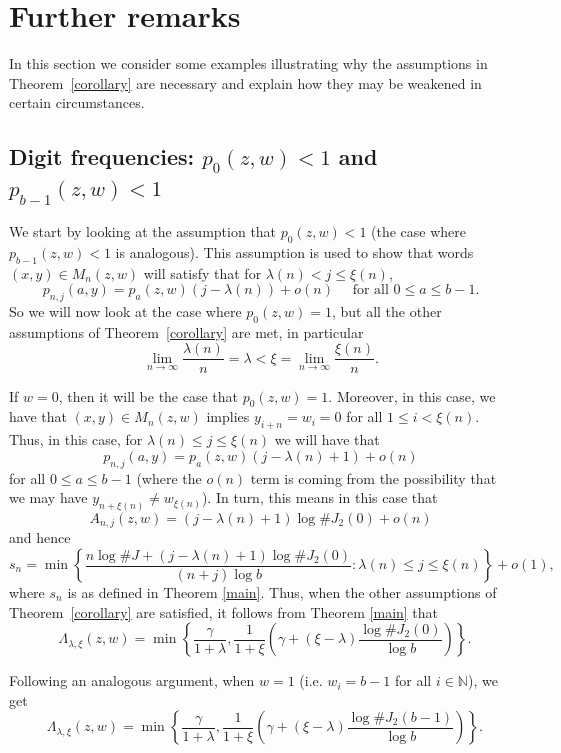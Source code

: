 \documentclass[12pt]{article}
\theoremstyle{remark}
\numberwithin{equation}{section}
\renewcommand{\Bbb}[1]{\mathbb{#1}}
\newcommand{\N}{{\Bbb N}}         %
\newcommand{\0}{\mathbf{0}}
\DeclareMathOperator{\dimh}{\dim_H}
\begin{document}
 
\section{Further remarks} \label{further remarks}
In this section we consider some examples illustrating why the assumptions in Theorem~\ref{corollary} are necessary and explain how they may be weakened in certain circumstances. 

\subsection{Digit frequencies: $p_{0}(z,w) <1$ and $p_{b-1}(z,w)<1$}

We start by looking at the assumption that $p_{0}(z,w)<1$ (the case where $p_{b-1}(z,w)<1$ is analogous). This assumption is used to show that words $(x,y)\in M_n(z,w)$ will satisfy that for $\lambda(n)<j\leq\xi(n)$,
\begin{equation*}
p_{n,j}(a,y)=p_{a}(z,w)(j-\lambda(n))+\mathit{o}(n) \quad \text{ for all $0\leq a\leq b-1$.}
\end{equation*}
So we will now look at the case where $p_{0}(z,w)=1$, but all the other assumptions of Theorem~\ref{corollary} are met, in particular \[\lim_{n\to\infty}\frac{\lambda(n)}{n}=\lambda<\xi = \lim_{n\to\infty}\frac{\xi(n)}{n}.\]

If $w=0$, then it will be the case that \mbox{$p_{0}(z,w)=1$}. Moreover, in this case, we have that $(x,y)\in M_{n}(z,w)$ implies $y_{i+n}=w_i=0$ for all $1\leq i<\xi(n)$. Thus, in this case, for $\lambda(n)\leq j \leq \xi(n)$ we will have that 
\[p_{n,j}(a,y)=p_{a}(z,w)(j-\lambda(n)+1)+o(n)\] for all $0\leq a\leq b-1$ (where the $o(n)$ term is coming from the possibility that we may have $y_{n+\xi(n)} \neq w_{\xi(n)}$). In turn, this means in this case that 
\[A_{n,j}(z,w)=(j-\lambda(n)+1)\log{\#J_2(0)} + o(n)\] and hence
\[s_n = \min\left\{\frac{n \log{\#J} + (j-\lambda(n)+1)\log{\#J_2(0)}}{(n+j)\log{b}}: \lambda(n) \leq j \leq \xi(n)\right\} + o(1),\]
where $s_n$ is as defined in Theorem \ref{main}.
Thus, when the other assumptions of Theorem~\ref{corollary} are satisfied, it follows from Theorem \ref{main} that
\begin{equation} \label{zeros case} 
\dimh\Lambda_{\lambda,\xi}(z,w)=\min\left\{\frac{\gamma}{1+\lambda},\frac{1}{1+\xi}\left(\gamma+(\xi-\lambda)\frac{\log \#J_2(0)}{\log b}\right)\right\}.
\end{equation}

Following an analogous argument, when $w = 1$ (i.e. $w_i = b-1$ for all $i \in \N$), we get
\begin{equation} \label{b-1 case} 
\dimh\Lambda_{\lambda,\xi}(z,w)=\min\left\{\frac{\gamma}{1+\lambda},\frac{1}{1+\xi}\left(\gamma+(\xi-\lambda)\frac{\log \#J_2(b-1)}{\log b}\right)\right\}.
\end{equation}
\end{document}
